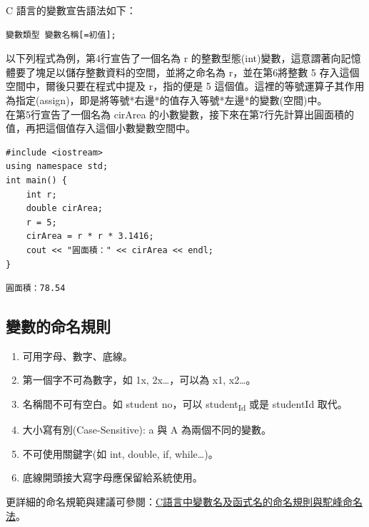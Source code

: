 \documentclass[a4paper,12pt]{article}
\begin{document}
C 語言的變數宣告語法如下：\\
\lstset{breaklines=true,language=:eval,label= ,caption= ,captionpos=b,numbers=none}
\begin{lstlisting}
變數類型 變數名稱[=初值];
\end{lstlisting}
以下列程式為例，第4行宣告了一個名為 r 的整數型態(int)變數，這意謂著向記憶體要了塊足以儲存整數資料的空間，並將之命名為 r，並在第6將整數 5 存入這個空間中，爾後只要在程式中提及 r，指的便是 5 這個值。這裡的等號運算子其作用為指定(assign)，即是將等號*右邊*的值存入等號*左邊*的變數(空間)中。\\

在第5行宣告了一個名為 cirArea 的小數變數，接下來在第7行先計算出圓面積的值，再把這個值存入這個小數變數空間中。\\
\lstset{breaklines=true,language=C++,label= ,caption= ,captionpos=b,firstnumber=1,numbers=left}
\begin{lstlisting}
#include <iostream>
using namespace std;
int main() {
    int r;
    double cirArea;
    r = 5;
    cirArea = r * r * 3.1416;
    cout << "圓面積：" << cirArea << endl;
}
\end{lstlisting}

\begin{verbatim}
圓面積：78.54
\end{verbatim}

\subsection{變數的命名規則}
\label{sec:org3f1a066}
\begin{enumerate}
\item 可用字母、數字、底線。\\
\item 第一個字不可為數字，如 1x, 2x\ldots{}，可以為 x1, x2\ldots{}。\\
\item 名稱間不可有空白。如 student no，可以 student\textsubscript{Id} 或是 studentId 取代。\\
\item 大小寫有別(Case-Sensitive): a 與 A 為兩個不同的變數。\\
\item 不可使用關鍵字(如 int, double, if, while\ldots{})。\\
\item 底線開頭接大寫字母應保留給系統使用。\\
\end{enumerate}
更詳細的命名規範與建議可參閱：\href{https://www.itread01.com/content/1541214186.html}{C語言中變數名及函式名的命名規則與駝峰命名法}。\\
\end{document}
